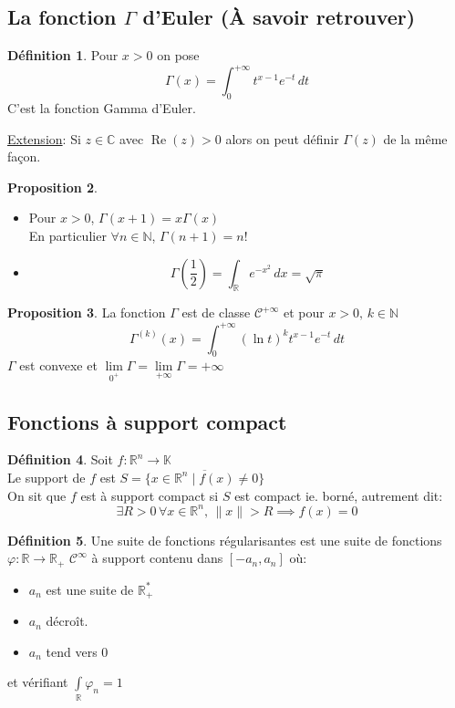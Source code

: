 \documentclass[10pt,a4paper]{article}
\theoremstyle{definition}
\newtheorem{proposition}{Proposition}[section]
\newtheorem{definition}[proposition]{Définition}
\DeclareMathOperator{\re}{Re}
\begin{document}
\subsection{La fonction \(\Gamma\) d'Euler (À savoir retrouver)}
\begin{definition}
    Pour \(x > 0\) on pose
    \[\Gamma(x) = \int_{0}^{+\infty}t^{x - 1}e^{-t} \,dt\]
    C'est la fonction Gamma d'Euler.
\end{definition}
\noindent \uline{Extension}: Si \(z \in \mathbb{C}\) avec \(\re(z) > 0\) alors on peut définir \(\Gamma(z)\) de la même façon.
\begin{proposition}
    \hfill
    \begin{itemize}
        \item Pour \(x > 0\), \(\Gamma(x + 1) = x\Gamma(x)\) \\ En particulier \(\forall n \in \mathbb{N}\), \(\Gamma(n + 1) = n!\)
        \item \[\Gamma\left(\frac{1}{2}\right) = \int_{\mathbb{R}} e^{-x^2} \,dx = \sqrt{\pi}\]
    \end{itemize}
\end{proposition}
\begin{proposition}
    La fonction \(\Gamma\) est de classe \(\mathcal{C}^{+\infty}\) et pour \(x > 0,\, k \in \mathbb{N}\)
    \[\Gamma^{(k)}(x) = \int_{0}^{+\infty}(\ln t)^k t^{x - 1} e^{-t} \,dt\]
    \(\Gamma\) est convexe et \(\lim\limits_{0^+} \Gamma = \lim\limits_{+\infty} \Gamma = +\infty\)
\end{proposition}

\subsection{Fonctions à support compact}
\begin{definition}
    Soit \(f: \mathbb{R}^n \to \mathbb{K}\) \\
    Le support de \(f\) est \(S = \overline{\{ x \in \mathbb{R}^n \mid f(x) \neq 0\}}\) \\
    On sit que \(f\) est à support compact si \(S\) est compact ie. borné, autrement dit:
    \[\exists R > 0 \, \forall x \in \mathbb{R}^n,\, \lVert x\rVert > R \implies f(x) = 0\]
\end{definition}
\begin{definition}
    Une suite de fonctions régularisantes est une suite de fonctions \\
    \(\varphi: \mathbb{R} \to \mathbb{R}_+\) \(\mathcal{C}^{\infty}\) à support contenu dans \([-a_n, a_n]\) où:
    \begin{itemize}
        \item \(a_n\) est une suite de \(\mathbb{R}_+^*\)
        \item \(a_n\) décroît.
        \item \(a_n\) tend vers \(0\)
    \end{itemize}
    et vérifiant \(\int\limits_{\mathbb{R}} \varphi_n = 1\)
\end{definition}
\end{document}
